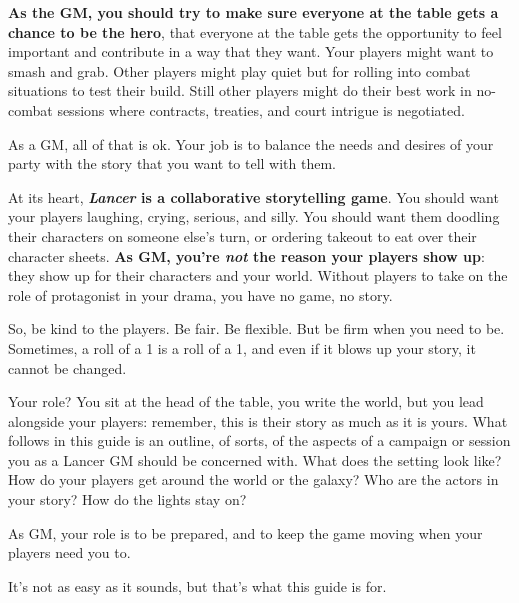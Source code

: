 \textbf{As the GM, you should try to make sure everyone at the table gets a chance to be the hero},
that everyone at the table gets the opportunity to feel important and contribute in a way that they
want. Your players might want to smash and grab. Other players might play quiet but for rolling
into combat situations to test their build. Still other players might do their best work in no-
combat sessions where contracts, treaties, and court intrigue is negotiated.

As a GM, all of that is ok. Your job is to balance the needs and desires of your party with the
story that you want to tell with them.

At its heart,\textbf{ \textit{Lancer} is a collaborative storytelling game}. You should want your players
laughing, crying, serious, and silly. You should want them doodling their characters on someone
else’s turn, or ordering takeout to eat over their character sheets. \textbf{As GM, you’re \textit{not} the reason
your players show up}: they show up for their characters and your world. Without players to take
on the role of protagonist in your drama, you have no game, no story.

So, be kind to the players. Be fair. Be flexible. But be firm when you need to be. Sometimes, a
roll of a 1 is a roll of a 1, and even if it blows up your story, it cannot be changed.

Your role? You sit at the head of the table, you write the world, but you lead alongside your
players: remember, this is their story as much as it is yours. What follows in this guide is an
outline, of sorts, of the aspects of a campaign or session you as a Lancer GM should be
concerned with. What does the setting look like? How do your players get around the world or
the galaxy? Who are the actors in your story? How do the lights stay on?

As GM, your role is to be prepared, and to keep the game moving when your players need you
to.

It’s not as easy as it sounds, but that’s what this guide is for.